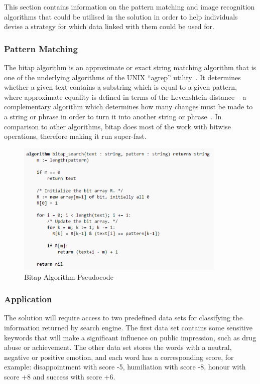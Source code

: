   This section contains information on the pattern matching and image recognition algorithms that could be utilised in the solution in order to help individuals devise a strategy for which data linked with them could be used for.

  \subsubsection{Pattern Matching}

    The bitap algorithm is an approximate or exact string matching algorithm that is one of the underlying algorithms of the UNIX ``agrep'' utility~\parencite{web:wu_2012}. It determines whether a given text contains a substring which is equal to a given pattern, where approximate equality is defined in terms of the Levenshtein distance – a complementary algorithm which determines how many changes must be made to a string or phrase in order to turn it into another string or phrase~\parencite{web:bryden_2011}. In comparison to other algorithms, bitap does most of the work with bitwise operations, therefore making it run super-fast.

    \begin{figure}
      \centering
      \begin{minipage}{10cm}
        \centering
        \includegraphics[width=10cm]{inc/bitap_algorithm.png}
        \caption{Bitap Algorithm Pseudocode}
        \label{fig:bitap_algorithm_pseudocode}
      \end{minipage}
    \end{figure}

  \subsubsection{Application}

    The solution will require access to two predefined data sets for classifying the information returned by search engine. The first data set contains some sensitive keywords that will make a significant influence on public impression, such as drug abuse or achievement. The other data set stores the words with a neutral, negative or positive emotion, and each word has a corresponding score, for example: disappointment with score -5, humiliation with score -8, honour with score +8 and success with score +6. 

